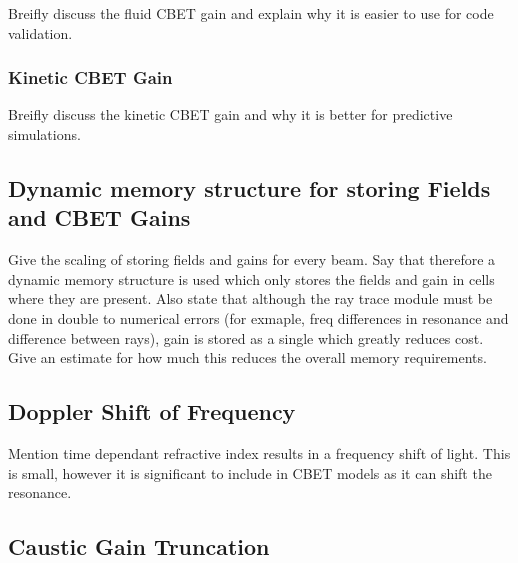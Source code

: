 Breifly discuss the fluid CBET gain and explain why it is easier to use for code validation.

\subsubsection{Kinetic CBET Gain}

Breifly discuss the kinetic CBET gain and why it is better for predictive simulations.

\subsection{Dynamic memory structure for storing Fields and CBET Gains}

Give the scaling of storing fields and gains for every beam.
Say that therefore a dynamic memory structure is used which only stores the fields and gain in cells where they are present.
Also state that although the ray trace module must be done in double to numerical errors (for exmaple, freq differences in resonance and difference between rays), gain is stored as a single which greatly reduces cost.
Give an estimate for how much this reduces the overall memory requirements.

\subsection{Doppler Shift of Frequency}%
\label{sec:SOLAS_doppler}

Mention time dependant refractive index results in a frequency shift of light.
This is small, however it is significant to include in CBET models as it can shift the resonance.

\subsection{Caustic Gain Truncation}

